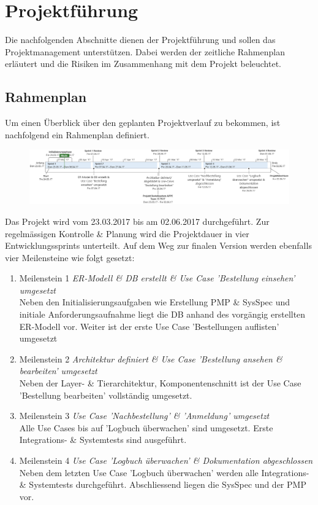 \section{Projektführung}
Die nachfolgenden Abschnitte dienen der Projektführung und sollen das Projektmanagement unterstützen. Dabei werden der zeitliche Rahmenplan erläutert und die Risiken im Zusammenhang mit dem Projekt beleuchtet.
\subsection{Rahmenplan}
Um einen Überblick über den geplanten Projektverlauf zu bekommen, ist nachfolgend
ein Rahmenplan definiert.
\begin{figure}[H]%
\centering
\includegraphics[width=1.0\textwidth]{Images/GroberTerminplan.png}
\label{fig:title}
\end{figure}
Das Projekt wird vom 23.03.2017 bis am 02.06.2017 durchgeführt. Zur regelmässigen Kontrolle \& Planung wird die Projektdauer in vier Entwicklungssprints unterteilt. Auf dem Weg zur finalen Version werden ebenfalls vier Meilensteine wie folgt gesetzt:
\begin{enumerate}
\item Meilenstein 1 \textit{ER-Modell \& DB erstellt \& Use Case 'Bestellung einsehen' umgesetzt}\\
Neben den Initialisierungsaufgaben wie Erstellung PMP \& SysSpec und initiale Anforderungsaufnahme liegt die DB anhand des vorgängig erstellten ER-Modell vor. Weiter ist der erste Use Case 'Bestellungen auflisten' umgesetzt
\item Meilenstein 2 \textit{Architektur definiert \& Use Case 'Bestellung ansehen \& bearbeiten' umgesetzt}\\
Neben der Layer- \& Tierarchitektur, Komponentenschnitt ist der Use Case 'Bestellung bearbeiten' vollständig umgesetzt. 
\item Meilenstein 3 \textit{Use Case 'Nachbestellung' \& 'Anmeldung' umgesetzt} \\
Alle Use Cases bis auf 'Logbuch überwachen' sind umgesetzt. Erste Integrations- \& Systemtests sind ausgeführt.
\item Meilenstein 4 \textit{Use Case 'Logbuch überwachen' \& Dokumentation abgeschlossen}\\
Neben dem letzten Use Case 'Logbuch überwachen' werden alle Integrations- \& Systemtests durchgeführt. Abschliessend liegen die SysSpec und der PMP vor.
\end{enumerate}
\clearpage
